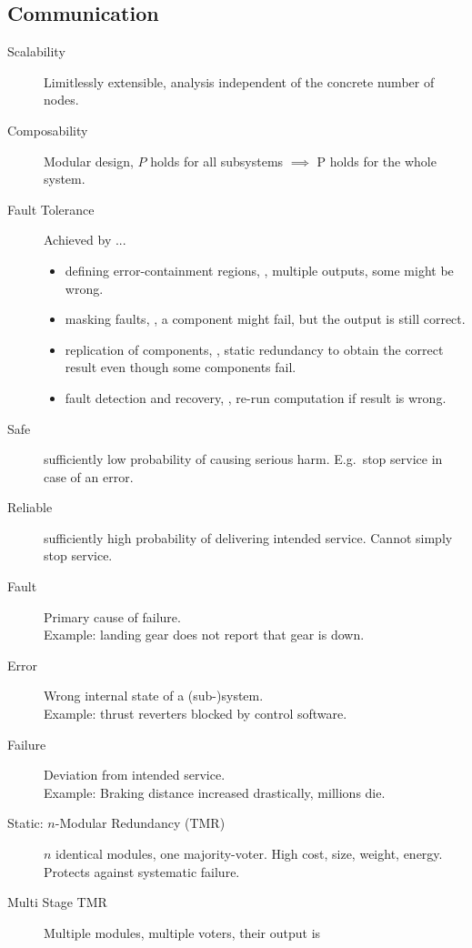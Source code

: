 \subsection*{Communication}

\begin{description}
    \item[Scalability] Limitlessly extensible, analysis independent of the
    concrete number of nodes.
    \item[Composability] Modular design, $P$ holds for all subsystems $\implies$ 
    P holds for the whole system.
    \item[Fault Tolerance] Achieved by ...
        \begin{itemize}
            \item defining error-containment regions, \ie, multiple outputs,
            some might be wrong.
            \item masking faults, \ie, a component might fail, but the output is
            still correct.
            \item replication of components, \ie, static redundancy to obtain
            the correct result even though some components fail.
            \item fault detection and recovery, \ie, re-run computation if
            result is wrong.
        \end{itemize}
    \item[Safe] sufficiently low probability of causing serious harm. E.g.\ stop
    service in case of an error.
    \item[Reliable] sufficiently high probability of delivering intended
    service. Cannot simply stop service.
    \item[Fault] Primary cause of failure.\\
    Example: landing gear does not report that gear is down.
    \item[Error] Wrong internal state of a (sub-)system. \\
    Example: thrust reverters blocked by control software.
    \item[Failure] Deviation from intended service. \\
    Example: Braking distance increased drastically, millions die.
    \item[Static: $n$-Modular Redundancy (TMR)] $n$ identical modules, one
    majority-voter.
    High cost, size, weight, energy. Protects against systematic failure.
    \item[Multi Stage TMR] Multiple modules, multiple voters, their output is

\end{description}
